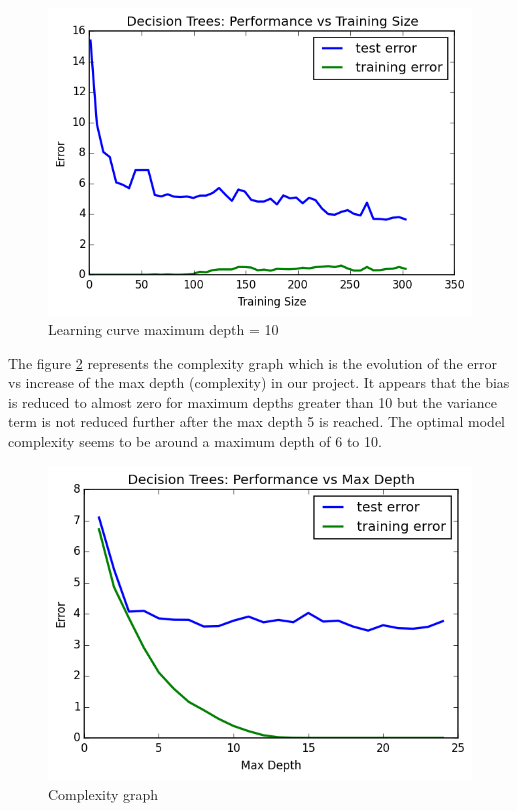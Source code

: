 \documentclass{article}
\begin{document}
\begin{figure}[h]
  \begin{center}
	\caption{\label{learning_curve_10} Learning curve maximum depth = 10}
	\includegraphics[width=0.75\columnwidth]{learning_curve_depth_10} %
	\end{center}
\end{figure}

The figure \ref{complexity_graph} represents the complexity graph which is the evolution of the error vs increase of the max depth (complexity) in our project. It appears that the bias is reduced to almost zero for maximum depths greater than  \num{10} but the variance term is not reduced further after the max depth  \num{5} is reached. The optimal model complexity seems to be around a maximum depth of \num{6} to \num{10}. 


\begin{figure}[h]
  \begin{center}
	\caption{\label{complexity_graph} Complexity graph}
	\includegraphics[width=0.75\columnwidth]{complexity_graph} %
	\end{center}
\end{figure}
\end{document}
